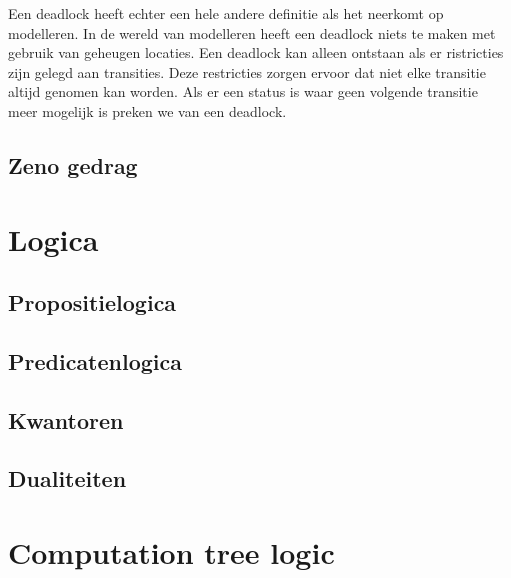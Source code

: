 \documentclass{article}%
\begin{document}
Een deadlock heeft echter een hele andere definitie als het neerkomt op modelleren. In de wereld van modelleren heeft een deadlock niets te maken met gebruik van geheugen locaties. Een deadlock kan alleen ontstaan als er ristricties zijn gelegd aan transities. Deze restricties zorgen ervoor dat niet elke transitie altijd genomen kan worden. Als er een status is waar geen volgende transitie meer mogelijk is preken we van een deadlock.

\subsection{Zeno gedrag}
\section{Logica}
\subsection{Propositielogica}
\subsection{Predicatenlogica}
\subsection{Kwantoren}
\subsection{Dualiteiten}


\section{Computation tree logic}

\end{document}
